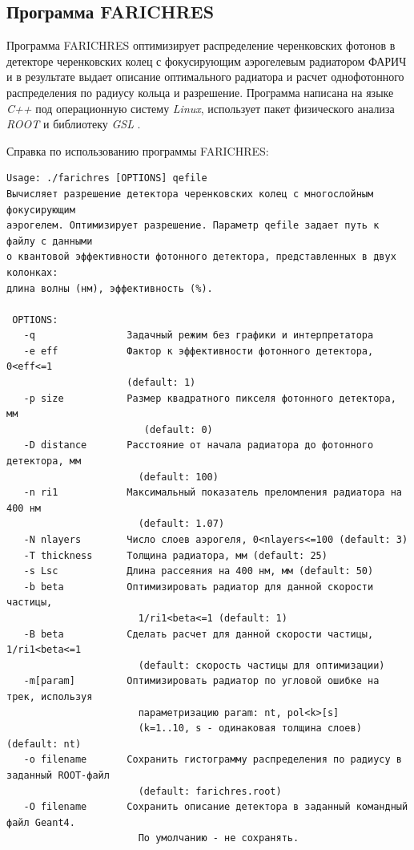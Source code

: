 \documentclass[12pt]{article}
\begin{document}
\subsection{Программа FARICHRES}
Программа FARICHRES оптимизирует распределение черенковских фотонов в детекторе 
черенковских колец с фокусирующим аэрогелевым радиатором ФАРИЧ и в результате выдает описание оптимального радиатора и 
расчет однофотонного распределения по радиусу кольца и разрешение. 
Программа написана на языке {\em C++} под операционную систему {\em Linux}, использует пакет физического анализа {\em ROOT} \cite{root} и библиотеку {\em GSL} \cite{gsl}.

Справка по использованию программы FARICHRES:
{\small
\begin{verbatim}
Usage: ./farichres [OPTIONS] qefile
Вычисляет разрешение детектора черенковских колец с многослойным фокусирующим 
аэрогелем. Оптимизирует разрешение. Параметр qefile задает путь к файлу с данными 
о квантовой эффективности фотонного детектора, представленных в двух колонках: 
длина волны (нм), эффективность (%).

 OPTIONS:
   -q                Задачный режим без графики и интерпретатора
   -e eff            Фактор к эффективности фотонного детектора, 0<eff<=1 
                     (default: 1)
   -p size           Размер квадратного пикселя фотонного детектора, мм 
                        (default: 0)
   -D distance       Расстояние от начала радиатора до фотонного детектора, мм 
                       (default: 100)
   -n ri1            Максимальный показатель преломления радиатора на 400 нм 
                       (default: 1.07)
   -N nlayers        Число слоев аэрогеля, 0<nlayers<=100 (default: 3)
   -T thickness      Толщина радиатора, мм (default: 25)
   -s Lsc            Длина рассеяния на 400 нм, мм (default: 50)
   -b beta           Оптимизировать радиатор для данной скорости частицы, 
                       1/ri1<beta<=1 (default: 1)
   -B beta           Сделать расчет для данной скорости частицы, 1/ri1<beta<=1 
                       (default: скорость частицы для оптимизации)
   -m[param]         Оптимизировать радиатор по угловой ошибке на трек, используя 
                       параметризацию param: nt, pol<k>[s] 
                       (k=1..10, s - одинаковая толщина слоев) (default: nt)
   -o filename       Сохранить гистограмму распределения по радиусу в заданный ROOT-файл 
                       (default: farichres.root)
   -O filename       Сохранить описание детектора в заданный командный файл Geant4. 
                       По умолчанию - не сохранять.
\end{verbatim}
}
\end{document}
